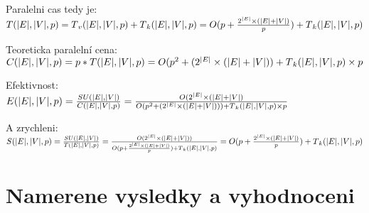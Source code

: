 Paralelni cas tedy je:\\

\begin{math}
T(|E|,|V|,p) = T{_{v}}(|E|,|V|,p) + T{_{k}}(|E|, |V|,p) =  O(p + \frac{2^{|E|} \times (|E| + |V|)}{p}) + T{_{k}}(|E|,|V|,p)\\
\end{math}

Teoreticka paralelní cena:\\ 

\begin{math}
C(|E|,|V|,p) = p*T(|E|,|V|,p) =  O(p^2 + (2^{|E|} \times (|E| + |V|)) + T{_{k}}(|E|,|V|,p) \times p\\
\end{math}

Efektivnost:\\

\begin{math}
E(|E|,|V|,p) = \frac{SU(|E|,|V|)}{C(|E|,|V|,p)} = \frac{O(2^{|E|} \times (|E| + |V|)} { O(p^2 + (2^{|E|} \times (|E| + |V|))) + T{_{k}}(|E|,|V|,p) \times p}\\
\end{math}

A zrychleni:\\

\begin{math}
S(|E|,|V|,p) = \frac{SU(|E|,|V|)}{T(|E|,|V|,p)} =  \frac{ O(2^{|E|} \times (|E| + |V|))}{O(p + \frac{2^{|E|} \times (|E| + |V|)}{p}) + T{_{k}}(|E|,|V|,p)} =O(p + \frac{2^{|E|} \times (|E| + |V|)}{p}) + T{_{k}}(|E|,|V|,p)\\
\end{math}



\section{Namerene vysledky a vyhodnoceni}

